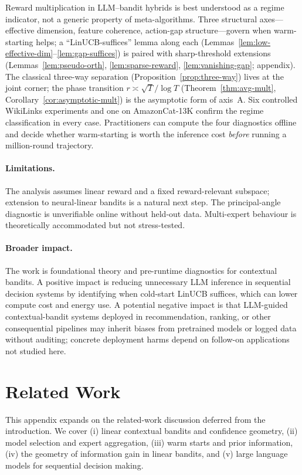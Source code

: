 \documentclass{article}
\theoremstyle{definition}
\theoremstyle{remark}
\theoremstyle{remark}
\begin{document}
Reward multiplication in LLM--bandit hybrids is best understood as a regime
indicator, not a generic property of meta-algorithms. Three structural
axes---effective dimension, feature coherence, action-gap structure---govern
when warm-starting helps; a ``LinUCB-suffices'' lemma along each
(Lemmas~\ref{lem:low-effective-dim}--\ref{lem:gap-suffices}) is paired with
sharp-threshold extensions (Lemmas~\ref{lem:pseudo-orth},
\ref{lem:sparse-reward}, \ref{lem:vanishing-gap}; appendix). The classical
three-way separation \cite{chen2024llmdecision}
(Proposition~\ref{prop:three-way}) lives at the joint corner; the phase
transition $r\asymp\sqrt T/\log T$ (Theorem~\ref{thm:avg-mult},
Corollary~\ref{cor:asymptotic-mult}) is the asymptotic form of
axis~A. Six controlled WikiLinks experiments and one on AmazonCat-13K
confirm the regime classification in every case. Practitioners can compute
the four diagnostics offline and decide whether warm-starting is worth the
inference cost \emph{before} running a million-round trajectory.

\paragraph{Limitations.}
The analysis assumes linear reward and a fixed reward-relevant subspace;
extension to neural-linear bandits is a natural next step. The principal-angle
diagnostic is unverifiable online without held-out data. Multi-expert
behaviour is theoretically accommodated but not stress-tested.

\paragraph{Broader impact.}
The work is foundational theory and pre-runtime diagnostics for contextual
bandits. A positive impact is reducing unnecessary LLM inference in
sequential decision systems by identifying when cold-start LinUCB suffices,
which can lower compute cost and energy use. A potential negative impact is
that LLM-guided contextual-bandit systems deployed in recommendation,
ranking, or other consequential pipelines may inherit biases from pretrained
models or logged data without auditing; concrete deployment harms depend on
follow-on applications not studied here.





\appendix

\section{Related Work}\label{sec:related}
This appendix expands on the related-work discussion deferred from the
introduction. We cover (i) linear contextual bandits and confidence geometry,
(ii) model selection and expert aggregation, (iii) warm starts and prior
information, (iv) the geometry of information gain in linear bandits, and
(v) large language models for sequential decision making.
\end{document}
